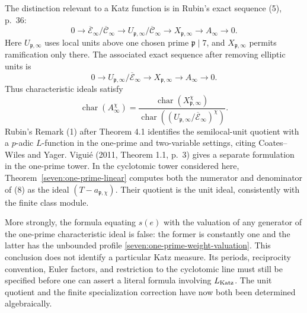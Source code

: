 \documentclass[11pt]{article}
\begin{document}
The distinction relevant to a Katz function is in Rubin's exact sequence (5), p.~36:
\[
0\longrightarrow\overline{\mathcal E}_\infty/
                 \overline{\mathcal C}_\infty
\longrightarrow U_{\mathfrak p,\infty}/
                 \overline{\mathcal C}_\infty
\longrightarrow X_{\mathfrak p,\infty}
\longrightarrow A_\infty\longrightarrow0.
\]
Here $U_{\mathfrak p,\infty}$ uses local units above one chosen prime $\mathfrak p\mid7$, and $X_{\mathfrak p,\infty}$ permits ramification only there. The associated exact sequence after removing elliptic units is
\[
0\longrightarrow U_{\mathfrak p,\infty}/
                  \overline{\mathcal E}_\infty
\longrightarrow X_{\mathfrak p,\infty}
\longrightarrow A_\infty\longrightarrow0.
\tag{7b}
\]
Thus characteristic ideals satisfy
\[
 \operatorname{char}(A_\infty^\chi)=
 \frac{\operatorname{char}(X_{\mathfrak p,\infty}^\chi)}
 {\operatorname{char}((U_{\mathfrak p,\infty}/
                       \overline{\mathcal E}_\infty)^\chi)}.
\tag{8}
\]
Rubin's Remark (1) after Theorem 4.1 identifies the semilocal-unit quotient with a $p$-adic $L$-function in the one-prime and two-variable settings, citing Coates--Wiles and Yager. Vigui\'e (2011, Theorem 1.1, p.~3) gives a separate formulation in the one-prime tower. In the cyclotomic tower considered here, Theorem~\ref{seven:one-prime-linear} computes both the numerator and denominator of (8) as the ideal $(T-a_{\mathfrak p,\chi})$. Their quotient is the unit ideal, consistently with the finite class module.

More strongly, the formula equating $s(e)$ with the valuation of any generator of the one-prime characteristic ideal is false: the former is constantly one and the latter has the unbounded profile \eqref{seven:one-prime-weight-valuation}. This conclusion does not identify a particular Katz measure. Its periods, reciprocity convention, Euler factors, and restriction to the cyclotomic line must still be specified before one can assert a literal formula involving $L_{\rm Katz}$. The unit quotient and the finite specialization correction have now both been determined algebraically.
\end{document}
